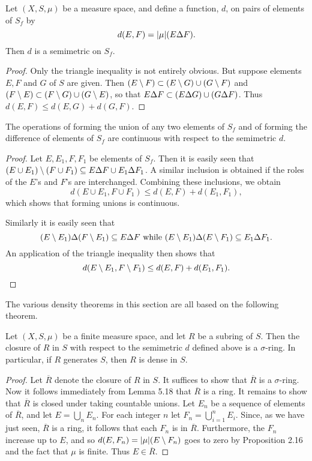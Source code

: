 \begin{proposition}
Let $(X,S,\mu)$ be a measure space, and define a function, $d$, on pairs of elements of $S_f$ by $$d(E, F)=|\mu|(E\Delta F).$$ Then $d$ is a semimetric on $S_f$.
\end{proposition}

\begin{proof}
Only the triangle inequality is not entirely obvious. But suppose elements $E,F$ and $G$ of $S$ are given. Then $(E\setminus F)\subset(E\setminus G)\cup(G\setminus F)$ and $(F\setminus E)\subset(F\setminus G)\cup(G\setminus E)$, so that $E\Delta F\subset(E\Delta G)\cup(G\Delta F)$. Thus $d(E,F)\leq d(E,G)+d(G,F)$.
\end{proof}

\begin{proposition}
The operations of forming the union of any two elements of $S_f$ and of forming the difference of elements of $S_f$ are continuous with respect to the semimetric $d$.
\end{proposition}

\begin{proof}
Let $E,E_1,F,F_1$ be elements of $S_f$. Then it is easily seen that $(E\cup E_1)\setminus(F\cup F_1)\subseteq E\Delta F\cup E_1\Delta F_1$. A similar inclusion is obtained if the roles of the $E$'s and $F$'s are interchanged. Combining these inclusions, we obtain $$d(E\cup E_1,F\cup F_1)\leq d(E,F)+d(E_1, F_1),$$
which shows that forming unions is continuous.

Similarly it is easily seen that $$(E\setminus E_1)\Delta(F\setminus E_1)\subseteq E\Delta F\text{ while }(E\setminus E_1)\Delta(E\setminus F_1)\subseteq E_1\Delta F_1.$$ An application of the triangle inequality then shows that $$d(E\setminus E_1,F\setminus F_1)\leq d(E, F)+d(E_1,F_1).$$
\end{proof}

The various density theorems in this section are all based on the following theorem.

\begin{theorem}
Let $(X,S,\mu)$ be a finite measure space, and let $R$ be a subring of $S$. Then the closure of $R$ in $S$ with respect to the semimetric $d$ defined above is a $\sigma$-ring. In particular, if $R$ generates $S$, then $R$ is dense in $S$.
\end{theorem}

\begin{proof}
Let $\overline{R}$ denote the closure of $R$ in $S$. It suffices to show that $\overline{R}$ is a $\sigma$-ring. Now it follows immediately from Lemma 5.18 that $\overline{R}$ is a ring. It remains to show that $\overline{R}$ is closed under taking countable unions. Let $E_n$ be a sequence of elements of $\overline{R}$, and let $E=\bigcup_nE_n$. For each integer $n$ let $F_n=\bigcup_{i=1}^nE_i$. Since, as we have just seen, $\overline{R}$ is a ring, it follows that each $F_n$ is in $\overline{R}$. Furthermore, the $F_n$ increase up to $E$, and so $d(E,F_n)=|\mu|(E\setminus F_n)$ goes to zero by Proposition 2.16 and the fact that $\mu$ is finite. Thus $E\in\overline{R}$.
\end{proof}

